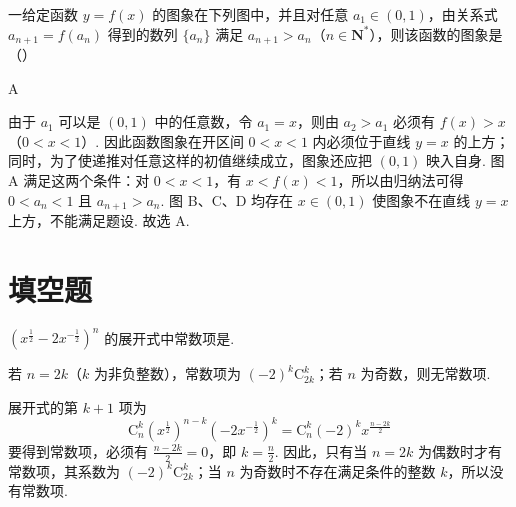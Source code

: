 \begin{problem}
一给定函数 \(y = f(x)\) 的图象在下列图中，并且对任意 \(a_{1} \in (0,1)\)，由关系式 \(a_{n+1} = f(a_n)\) 得到的数列 \(\{a_n\}\) 满足 \(a_{n+1} > a_n\)（\(n \in \mathbf{N}^*\)），则该函数的图象是（\quad）

    {}
    {}
    {}

\begin{answer}
A
\end{answer}

\begin{solution}
由于 \(a_1\) 可以是 \((0,1)\) 中的任意数，令 \(a_1=x\)，则由 \(a_2>a_1\) 必须有 \(f(x)>x\)（\(0<x<1\)）.
因此函数图象在开区间 \(0<x<1\) 内必须位于直线 \(y=x\) 的上方；同时，为了使递推对任意这样的初值继续成立，图象还应把 \((0,1)\) 映入自身. 图 A 满足这两个条件：对 \(0<x<1\)，有 \(x<f(x)<1\)，所以由归纳法可得 \(0<a_n<1\) 且 \(a_{n+1}>a_n\). 图 B、C、D 均存在 \(x\in(0,1)\) 使图象不在直线 \(y=x\) 上方，不能满足题设. 故选 A.
\end{solution}
\end{problem}

\section{填空题}
\begin{problem}
\(\left(x^{\frac{1}{2}} - 2x^{-\frac{1}{2}}\right)^{n}\) 的展开式中常数项是\fillinblank{}.

\begin{answer}
若 \(n=2k\)（\(k\) 为非负整数），常数项为 \((-2)^k\mathrm C_{2k}^{k}\)；若 \(n\) 为奇数，则无常数项.
\end{answer}

\begin{solution}
展开式的第 \(k+1\) 项为
\[
\mathrm C_n^k\left(x^{\frac{1}{2}}\right)^{n-k}\left(-2x^{-\frac{1}{2}}\right)^k
=\mathrm C_n^k(-2)^k x^{\frac{n-2k}{2}}
\]
要得到常数项，必须有 \(\frac{n-2k}{2}=0\)，即 \(k=\frac n2\). 因此，只有当 \(n=2k\) 为偶数时才有常数项，其系数为 \((-2)^k\mathrm C_{2k}^{k}\)；当 \(n\) 为奇数时不存在满足条件的整数 \(k\)，所以没有常数项.
\end{solution}
\end{problem}

